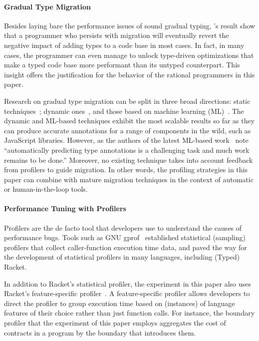 \paragraph{Gradual Type Migration} Besides laying bare the performance
issues of sound gradual typing, \citet{gtnffvf-jfp-2019}'s result show
that a programmer who persists with migration will eventually revert the
negative impact of adding types to a code base in most cases. In fact, in
many cases, the programmer can even manage to unlock type-driven
optimizations that make a typed code base more performant than its untyped
counterpart. This insight offers the justification for the behavior of 
the rational programmers in this paper. 

Research on gradual type migration can be split in three broad directions:
static techniques~\cite{rch:in-out-infer-gt, km:ts-type-evo,
mp:gt-decidable, ccew:gt-migrate, gc:gt-infer,
cagg-solver-based-migration,clps-popl-2020,js-infer,ruby-static-infer,unif-infer};
dynamic
ones~\cite{msi:gt-infer-hm, dyn-infer-ruby, profile-guided-typing, gen-ts-decl, jstrace},
and those based on machine learning
(ML)~\cite{lambdanet,nl2ptype,learn-types-big-data,ml-ts}. The dynamic
and ML-based techniques exhibit the most scalable results so far as they
can produce accurate annotations for a range of components in the wild,
such as JavaScript libraries. However, as the authors of the latest
ML-based work~\cite{ml-ts} note ``automatically predicting type annotations is a
challenging task and much work remains to be done.'' Moreover, no existing
technique takes into account feedback from profilers to guide migration.
In other words,  the profiling strategies in this paper can combine
with mature migration techniques in the context of automatic or
human-in-the-loop tools.
 
\paragraph{Performance Tuning with Profilers} Profilers are the de facto
tool that developers use to understand the causes of performance bugs. 
Tools such as GNU gprof~\cite{gprof} established statistical (sampling) 
profilers that collect caller-function execution time data, and paved the
way for the development of statistical profilers in many languages,
including (Typed) Racket.

In addition to Racket's statistical profiler, the experiment in this
paper also uses Racket's feature-specific
profiler~\cite{astavf-feature-prf, staaf-feature-prf}. A
feature-specific profiler allows developers to direct the profiler to
group execution time based on (instances) of language features of
their choice rather than just function calls.  For instance, the
boundary profiler that the experiment of this paper employs aggregates
the cost of contracts in a program by the boundary that introduces
them.

